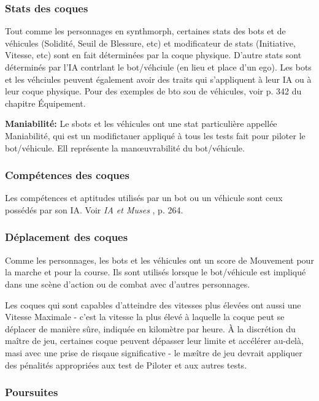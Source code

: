 \subsubsection{Stats des coques} 

Tout comme les personnages en synthmorph, certaines stats des bots et de véhicules (Solidité, Seuil de Blessure, etc) et modificateur de stats (Initiative, Vitesse, etc) sont en fait déterminées par la coque physique. D'autre stats sont déterminés par l'IA contrlant le bot/véhciule (en lieu et place d'un ego). Les bots et les véhciules peuvent également avoir des traits qui s'appliquent à leur IA ou à leur coque physique. Pour des exemples de bto sou de véhicules, voir p. 342 du chapitre Équipement. 

\textbf{Maniabilité:} Le sbots et les véhicules ont une stat particulière appellée Maniabilité, qui est un modifictauer appliqué à tous les tests fait pour piloter le bot/véhicule. Ell représente la manœuvrabilité du bot/véhicule. 

\subsubsection{Compétences des coques} 

Les compétences et aptitudes utilisés par un bot ou un véhicule sont ceux possédés par son IA. Voir \emph{IA et Muses }, p. 264. 

\subsubsection{Déplacement des coques} 

Comme les personnages, les bots et les véhicules ont un score de Mouvement pour la marche et pour la course. Ils sont utilisés lorsque le bot/véhicule est impliqué dans une scène d'action ou de combat avec d'autres personnages. 

Les coques qui sont capables d'atteindre des vitesses plus élevées ont aussi une Vitesse Maximale - c'est la vitesse la plus élevé à laquelle la coque peut se déplacer de manière sûre, indiquée en kilomètre par heure. À la discrétion du maître de jeu, certaines coque peuvent dépasser leur limite et accélérer au-delà, masi avec une prise de risqaue significative - le mæître de jeu devrait appliquer des pénalités appropriées aux test de Piloter et aux autres tests. 

\subsubsection{Poursuites} 

